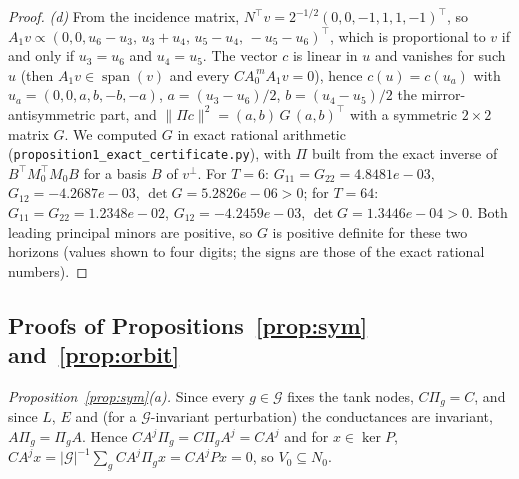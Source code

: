 \documentclass[conference]{IEEEtran}
\begin{document}
\begin{proof}
\emph{(d)} From the incidence matrix, $N^\top v=2^{-1/2}(0,0,-1,1,1,-1)^\top$, so $A_1v\propto(0,0,u_6-u_3,\,u_3+u_4,\,u_5-u_4,\,-u_5-u_6)^\top$, which is proportional to $v$ if and only if $u_3=u_6$ and $u_4=u_5$. The vector $c$ is linear in $u$ and vanishes for such $u$ (then $A_1v\in\operatorname{span}(v)$ and every $CA_0^{\,m}A_1v=0$), hence $c(u)=c(u_a)$ with $u_a=(0,0,a,b,-b,-a)$, $a=(u_3-u_6)/2$, $b=(u_4-u_5)/2$ the mirror-antisymmetric part, and $\|\Pi c\|^2=(a,b)\,G\,(a,b)^\top$ with a symmetric $2\times2$ matrix $G$. We computed $G$ in exact rational arithmetic (\texttt{proposition1\_exact\_certificate.py}), with $\Pi$ built from the exact inverse of $B^\top M_0^\top M_0B$ for a basis $B$ of $v^\perp$. For $T=6$: $G_{11}=G_{22}=4.8481e-03$, $G_{12}=-4.2687e-03$, $\det G=5.2826e-06>0$; for $T=64$: $G_{11}=G_{22}=1.2348e-02$, $G_{12}=-4.2459e-03$, $\det G=1.3446e-04>0$. Both leading principal minors are positive, so $G$ is positive definite for these two horizons (values shown to four digits; the signs are those of the exact rational numbers).\end{proof}

\subsection*{Proofs of Propositions~\ref{prop:sym} and~\ref{prop:orbit}}
\emph{Proposition~\ref{prop:sym}(a).} Since every $g\in\mathcal G$ fixes the tank nodes, $C\Pi_g=C$, and since $L$, $E$ and (for a $\mathcal G$-invariant perturbation) the conductances are invariant, $A\Pi_g=\Pi_gA$. Hence $CA^j\Pi_g=C\Pi_gA^j=CA^j$ and for $x\in\ker P$, $CA^jx=|\mathcal G|^{-1}\sum_g CA^j\Pi_gx=CA^jPx=0$, so $V_0\subseteq N_0$.
\end{document}
